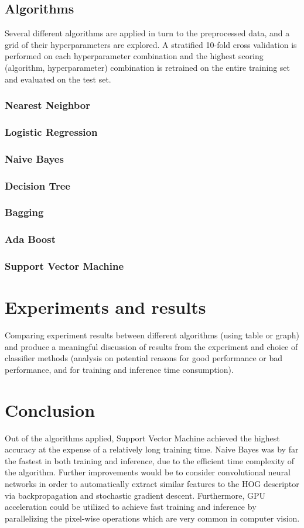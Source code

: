 \documentclass[landscape,twocolumn]{article}
\begin{document}
\subsection{Algorithms}
Several different algorithms are applied in turn to the preprocessed data, and a grid of their hyperparameters are explored. A stratified 10-fold cross validation is performed on each hyperparameter combination and the highest scoring (algorithm, hyperparameter) combination is retrained on the entire training set and evaluated on the test set.


\subsubsection{Nearest Neighbor}
\subsubsection{Logistic Regression}
\subsubsection{Naive Bayes}
\subsubsection{Decision Tree}
\subsubsection{Bagging}
\subsubsection{Ada Boost}
\subsubsection{Support Vector Machine}

\section{Experiments and results}
Comparing experiment results between different algorithms (using table or graph) and produce a meaningful discussion of results from the experiment and choice of classifier methods (analysis on potential reasons for good performance or bad performance, and for training and inference time consumption).

\section{Conclusion}
Out of the algorithms applied, Support Vector Machine achieved the highest accuracy at the expense of a relatively long training time. Naive Bayes was by far the fastest in both training and inference, due to the efficient time complexity of the algorithm. Further improvements would be to consider convolutional neural networks in order to automatically extract similar features to the HOG descriptor via backpropagation and stochastic gradient descent. Furthermore, GPU acceleration could be utilized to achieve fast training and inference by parallelizing the pixel-wise operations which are very common in computer vision.
\end{document}

